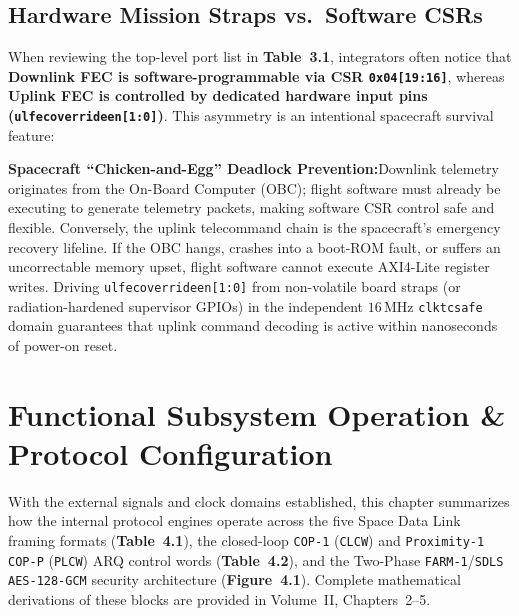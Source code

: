 \documentclass[10pt,a4paper]{article}
\renewcommand{\_}{\origunderscore\penalty0\hskip0pt\relax}
\newcommand{\cautionbox}[2]{%
  \par\vspace{4pt}\noindent\colorbox{warnbg}{%
    \parbox{\dimexpr\textwidth-2\fboxsep\relax}{%
      \vspace{4pt}\raggedright\textbf{\sffamily\color{warnfg}#1:}\hspace{0.4em}#2\vspace{4pt}%
    }%
  }\par\vspace{4pt}%
}
\numberwithin{table}{section}
\numberwithin{figure}{section}
\numberwithin{equation}{section}
\begin{document}
\subsection{Hardware Mission Straps vs.\ Software CSRs}
When reviewing the top-level port list in \textbf{Table~3.1}, integrators often notice that \textbf{Downlink FEC is software-programmable via CSR \texttt{0x04[19:16]}}, whereas \textbf{Uplink FEC is controlled by dedicated hardware input pins (\texttt{ul\_fec\_override\_en[1:0]})}. This asymmetry is an intentional spacecraft survival feature:

\cautionbox{Spacecraft ``Chicken-and-Egg'' Deadlock Prevention}{Downlink telemetry originates from the On-Board Computer (OBC); flight software must already be executing to generate telemetry packets, making software CSR control safe and flexible. Conversely, the uplink telecommand chain is the spacecraft's emergency recovery lifeline. If the OBC hangs, crashes into a boot-ROM fault, or suffers an uncorrectable memory upset, flight software cannot execute AXI4-Lite register writes. Driving \texttt{ul\_fec\_override\_en[1:0]} from non-volatile board straps (or radiation-hardened supervisor GPIOs) in the independent $16\,\text{MHz}$ \texttt{clk\_tc\_safe} domain guarantees that uplink command decoding is active within nanoseconds of power-on reset.}

\vspace{6pt}
\section{Functional Subsystem Operation \& Protocol Configuration}

With the external signals and clock domains established, this chapter summarizes how the internal protocol engines operate across the five Space Data Link framing formats (\textbf{Table~4.1}), the closed-loop \texttt{COP-1} (\texttt{CLCW}) and \texttt{Proximity-1 COP-P} (\texttt{PLCW}) ARQ control words (\textbf{Table~4.2}), and the Two-Phase \texttt{FARM-1}/\texttt{SDLS} \texttt{AES-128-GCM} security architecture (\textbf{Figure~4.1}). Complete mathematical derivations of these blocks are provided in Volume~II, Chapters~2--5.
\end{document}
